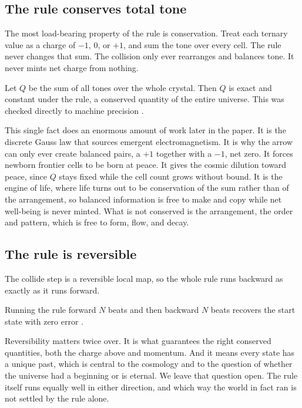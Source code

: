 \subsection{The rule conserves total tone}

The most load-bearing property of the rule is conservation. Treat each ternary value as a charge of $-1$, $0$, or
$+1$, and sum the tone over every cell. The rule never changes that sum. The collision only ever rearranges and
balances tone. It never mints net charge from nothing.

\begin{proposition}
Let $Q$ be the sum of all tones over the whole crystal. Then $Q$ is exact and constant under the rule, a conserved
quantity of the entire universe. This was checked directly to machine precision \cite{pollard2026vibetest}.
\end{proposition}

This single fact does an enormous amount of work later in the paper. It is the discrete Gauss law that sources
emergent electromagnetism. It is why the arrow can only ever create balanced pairs, a $+1$ together with a $-1$,
net zero. It forces newborn frontier cells to be born at peace. It gives the cosmic dilution toward peace, since
$Q$ stays fixed while the cell count grows without bound. It is the engine of life, where life turns out to be
conservation of the sum rather than of the arrangement, so balanced information is free to make and copy while
net well-being is never minted. What is not conserved is the arrangement, the order and pattern, which is free to
form, flow, and decay.

\subsection{The rule is reversible}

The collide step is a reversible local map, so the whole rule runs backward as exactly as it runs forward.

\begin{result}[Reversibility]
Running the rule forward $N$ beats and then backward $N$ beats recovers the start state with zero error
\cite{pollard2026vibetest}.
\end{result}

Reversibility matters twice over. It is what guarantees the right conserved quantities, both the charge above and
momentum. And it means every state has a unique past, which is central to the cosmology and to the question of
whether the universe had a beginning or is eternal. We leave that question open. The rule itself runs equally
well in either direction, and which way the world in fact ran is not settled by the rule alone.

